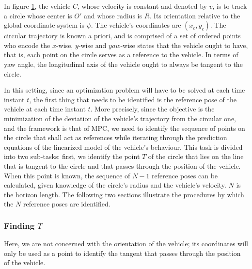 In figure \ref{fig:circular_mpc}, the vehicle $C$, whose velocity is constant
and denoted by $v$, is to track a circle whose center is $O'$ and whose
radius is $R$. Its orientation relative to the global coordinate system is
$\psi$. The vehicle's coordinates are $(x_c, y_c)$. The circular trajectory
is known a priori, and is comprised of a set of ordered points who encode
the $x$-wise, $y$-wise and $yaw$-wise states that the vehicle ought to have,
that is, each point on the circle serves as a reference to the vehicle. In terms
of yaw angle, the longitudinal axis of the vehicle ought to always be tangent
to the circle.


\begin{figure}[H]\centering
  \scalebox{0.7}{}
  \caption{}
  \label{fig:circular_mpc}
\end{figure}

In this setting, since an optimization problem will have to be solved at each
time instant $t$, the first thing that needs to be identified is the reference
pose of the vehicle at each time instant $t$. More precisely, since the
objective is the minimization of the deviation of the vehicle's trajectory
from the circular one, and the framework is that of MPC, we need to identify
the sequence of points on the circle that shall act as references while
iterating through the prediction equations of the linearized model of the
vehicle's behaviour. This task is divided into two sub-tasks: first, we
identify the point $T$ of the circle that lies on the line that is tangent to
the circle and that passes through the position of the vehicle. When this
point is known, the sequence of $N-1$ reference poses can be calculated,
given knowledge of the circle's radius and the vehicle's velocity. $N$ is the
horizon length. The following two sections illustrate the procedures by
which the $N$ reference poses are identified.

\subsubsection{Finding $T$}

Here, we are not concerned with the orientation of the vehicle; its coordinates
will only be used as a point to identify the tangent that passes through
the position of the vehicle.


\begin{figure}[H]\centering
  \scalebox{0.8}{}
  \caption{}
  \label{fig:circular_mpc_tan}
\end{figure}


